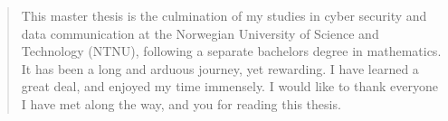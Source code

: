 \renewcommand{\abstractname}{\prefacename}
\begin{abstract}
\noindent This master thesis is the culmination of my studies in cyber security and data communication at the Norwegian University of Science and Technology (NTNU), following a separate bachelors degree in mathematics. It has been a long and arduous journey, yet rewarding. I have learned a great deal, and enjoyed my time immensely. I would like to thank everyone I have met along the way, and you for reading this thesis.
\end{abstract}
\cleardoublepage